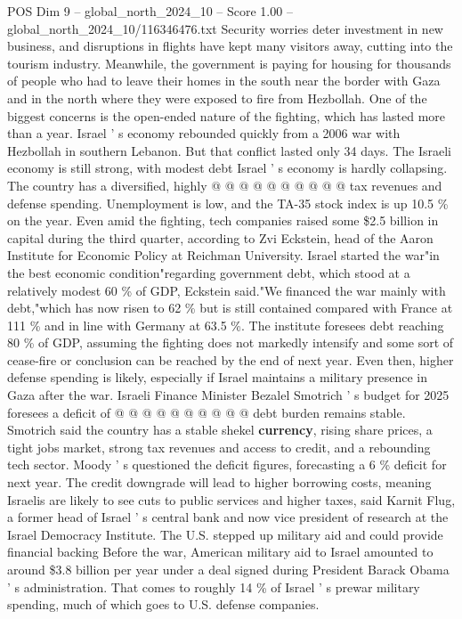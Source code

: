 \begin{textsample}{POS Dim 9 – global\_north\_2024\_10 – Score 1.00 – global\_north\_2024\_10/116346476.txt}
Security worries deter investment in new business, and disruptions in flights have kept many visitors away, cutting into the tourism industry.
Meanwhile, the government is paying for housing for thousands of people who had to leave their homes in the south near the border with Gaza and in the north where they were exposed to fire from Hezbollah.
One of the biggest concerns is the open-ended nature of the fighting, which has lasted more than a year.
Israel ' s economy rebounded quickly from a 2006 war with Hezbollah in southern Lebanon.
But that conflict lasted only 34 days.
The Israeli economy is still strong, with modest debt Israel ' s economy is hardly collapsing.
The country has a diversified, highly @ @ @ @ @ @ @ @ @ @ tax revenues and defense spending.
Unemployment is low, and the TA-35 stock index is up 10.5 \% on the year.
Even amid the fighting, tech companies raised some \$2.5 billion in capital during the third quarter, according to Zvi Eckstein, head of the Aaron Institute for Economic Policy at Reichman University.
Israel started the war"in the best economic condition"regarding government debt, which stood at a relatively modest 60 \% of GDP, Eckstein said."We financed the war mainly with debt,"which has now risen to 62 \% but is still contained compared with France at 111 \% and in line with Germany at 63.5 \%.
The institute foresees debt reaching 80 \% of GDP, assuming the fighting does not markedly intensify and some sort of cease-fire or conclusion can be reached by the end of next year.
Even then, higher defense spending is likely, especially if Israel maintains a military presence in Gaza after the war.
Israeli Finance Minister Bezalel Smotrich ' s budget for 2025 foresees a deficit of @ @ @ @ @ @ @ @ @ @ debt burden remains stable.
Smotrich said the country has a stable shekel \textbf{currency}, rising share prices, a tight jobs market, strong tax revenues and access to credit, and a rebounding tech sector.
Moody ' s questioned the deficit figures, forecasting a 6 \% deficit for next year.
The credit downgrade will lead to higher borrowing costs, meaning Israelis are likely to see cuts to public services and higher taxes, said Karnit Flug, a former head of Israel ' s central bank and now vice president of research at the Israel Democracy Institute.
The U.S. stepped up military aid and could provide financial backing Before the war, American military aid to Israel amounted to around \$3.8 billion per year under a deal signed during President Barack Obama ' s administration.
That comes to roughly 14 \% of Israel ' s prewar military spending, much of which goes to U.S. defense companies.

\end{textsample}
